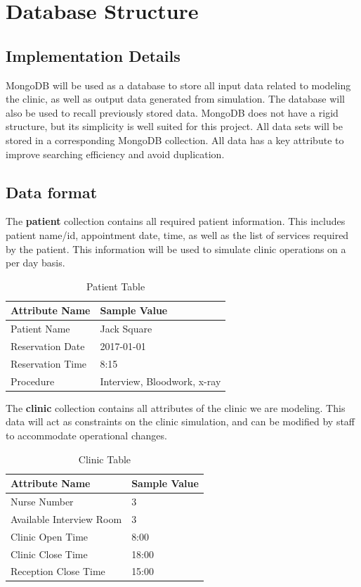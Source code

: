 \documentclass[12pt]{article}
\begin{document}
\section{Database Structure}

\subsection{Implementation Details}
MongoDB will be used as a database to store all input data related to modeling the clinic, as well as output data generated from simulation. The database will also be used to recall previously stored data. MongoDB does not have a rigid structure, but its simplicity is well suited for this project. All data sets will be stored in a corresponding MongoDB collection. All data has a key attribute to improve searching efficiency and avoid duplication.

\subsection{Data format}
The \textbf{patient} collection contains all required patient information. This includes patient name/id, appointment date, time, as well as the list of services required by the patient. This information will be used to simulate clinic operations on a per day basis.
\begin{table}[H]
\centering
\caption{Patient Table}
\label{patient-table}
\begin{tabular}{|l|l|}
\hline
Attribute Name   & Sample Value                \\ \hline
Patient Name     & Jack Square                 \\ \hline
Reservation Date & 2017-01-01                  \\ \hline
Reservation Time & 8:15                        \\ \hline
Procedure        & Interview, Bloodwork, x-ray \\ \hline
\end{tabular}
\end{table}
\hfill

The \textbf{clinic} collection contains all attributes of the clinic we are modeling. This data will act as constraints on the clinic simulation, and can be modified by staff to accommodate operational changes.
\begin{table}[H]
\centering
\caption{Clinic Table}
\label{clinic-table}
\begin{tabular}{|l|l|}
\hline
Attribute Name           & Sample Value \\ \hline
Nurse Number             & 3            \\ \hline
Available Interview Room & 3            \\ \hline
Clinic Open Time         & 8:00         \\ \hline
Clinic Close Time        & 18:00        \\ \hline
Reception Close Time     & 15:00        \\ \hline
\end{tabular}
\end{table}
\end{document}

